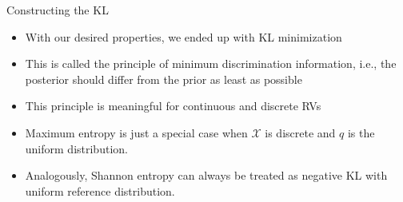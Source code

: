 \documentclass[11pt,compress,t,notes=noshow, xcolor=table]{beamer}
\begin{document}
\begin{vbframe}{Constructing the KL}
    \begin{itemize}
        \item With our desired properties, we ended up with KL minimization
        \item This is called the principle of minimum discrimination information, i.e., the posterior should differ from the prior as least as possible
        \item This principle is meaningful for continuous and discrete RVs
        \item Maximum entropy is just a special case when $\mathcal{X}$ is discrete and $q$ is the uniform distribution.
        \item Analogously, Shannon entropy can always be treated as negative KL  with uniform reference distribution.
    \end{itemize}
    
\end{vbframe}
\endlecture
\end{document}
